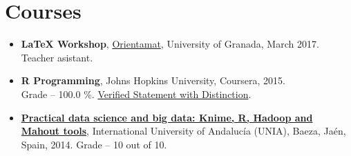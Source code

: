 \documentclass[10pt,a4paper,sans]{moderncv} %
\begin{document}

\vspace*{-2mm}
\section{Courses}

\begin{itemize}
\item \textbf{LaTeX Workshop}, \textcolor{color1}{\href{http://www.ugr.es/~orientamat/edicion4.html}{Orientamat}}, University of Granada, March 2017. Teacher asistant.
\item \textbf{R Programming}, Johns Hopkins University, Coursera, 2015. \\ Grade -- 100.0 \%. \textcolor{colorl}{\href{https://www.coursera.org/account/accomplishments/records/AHz97RsSWEVHpqkY}{Verified Statement with Distinction}}.
 
\item \href{http://blogs.unia.es/uniatv/archives/2571}{\textbf{Practical data science and big data: Knime, R, Hadoop and Mahout tools}}, International University of Andalucía (UNIA), Baeza, Ja\'en, Spain, 2014. Grade -- 10 out of 10.
\end{itemize}






\end{document}
